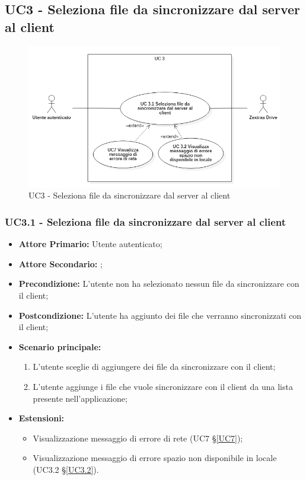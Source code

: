 \subsection{UC3 - Seleziona file da sincronizzare dal server al client}
\begin{figure}[H]
    \centering
    \includegraphics[scale = 0.6]{components/img/UC3.png}
    \caption{UC3 - Seleziona file da sincronizzare dal server al client}
\end{figure}
\subsubsection{UC3.1 - Seleziona file da sincronizzare dal server al client}
\begin{itemize}
\item \textbf{Attore Primario:} Utente autenticato;
\item \textbf{Attore Secondario:} ;
\item \textbf{Precondizione:} L'utente non ha selezionato nessun file da sincronizzare con il client;
\item \textbf{Postcondizione:} L'utente ha aggiunto dei file che verranno sincronizzati con il client;
\item \textbf{Scenario principale:}
    \begin{enumerate}
    \item L'utente sceglie di aggiungere dei file da sincronizzare con il client;
    \item L'utente aggiunge i file che vuole sincronizzare con il client da una lista presente nell'applicazione;
    \end{enumerate}
\item \textbf{Estensioni:}
    \begin{itemize}
    \item Visualizzazione messaggio di errore di rete (UC7 \S{}\ref{UC7});
    \item Visualizzazione messaggio di errore spazio non disponibile in locale (UC3.2 \S{}\ref{UC3.2}).
    \end{itemize}
\end{itemize}
